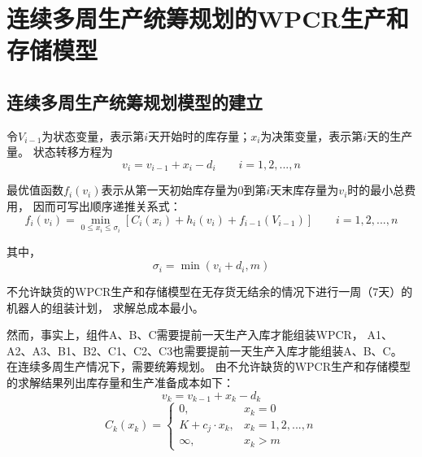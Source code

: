 %
%
%
%
%

\chapter{连续多周生产统筹规划的WPCR生产和存储模型}

\section{连续多周生产统筹规划模型的建立}

令$V_{i-1}$为状态变量，表示第$i$天开始时的库存量；$x_i$为决策变量，表示第$i$天的生产量。
状态转移方程为
\begin{equation*}
    v_i=v_{i-1}+x_i-d_i \qquad i=1,2,...,n
\end{equation*}

最优值函数$f_i(v_i)$表示从第一天初始库存量为$0$到第$i$天末库存量为$v_i$时的最小总费用，
因而可写出顺序递推关系式：
\begin{equation}
    f_i(v_i)=\mathop{\min}_{0\leq x_i \leq \sigma_i}[C_i(x_i)+h_i(v_i)+f_{i-1}(V_{i-1})] \qquad i=1,2,...,n
\end{equation}

其中，
\begin{equation}
    \sigma_i=\min(v_i+d_i,m)
\end{equation}

不允许缺货的WPCR生产和存储模型在无存货无结余的情况下进行一周（7天）的机器人的组装计划，
求解总成本最小。

然而，事实上，组件A、B、C需要提前一天生产入库才能组装WPCR，
A1、A2、A3、B1、B2、C1、C2、C3也需要提前一天生产入库才能组装A、B、C。
在连续多周生产情况下，需要统筹规划。
由不允许缺货的WPCR生产和存储模型的求解结果列出库存量和生产准备成本如下：
\begin{equation}
    v_k=v_{k-1}+x_k-d_k
\end{equation}
\begin{equation}
    C_k(x_k)=\begin{cases}
        0, & x_k=0 \\
        K+c_j \cdot x_k, & x_k=1,2,...,n \\
        \infty, & x_k > m
    \end{cases}
\end{equation}

